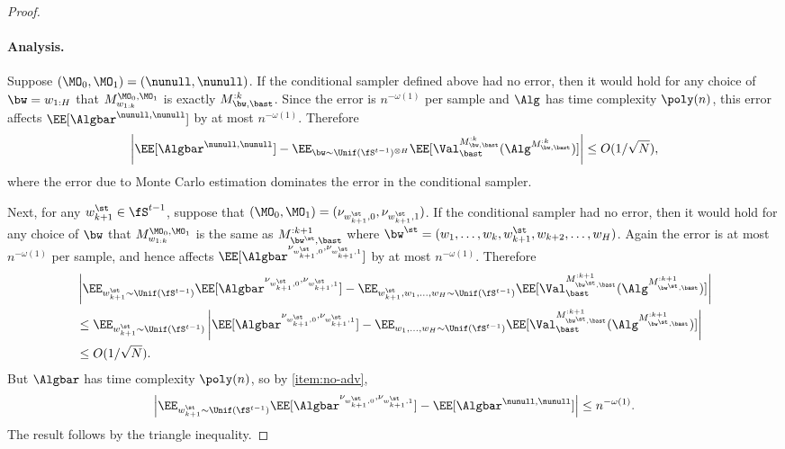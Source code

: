 \begin{proof}
\paragraph{Analysis.} Suppose $(\MO_0,\MO_1) = (\nunull,\nunull)$. If the conditional sampler defined above had no error, then it would hold for any choice of $\bw=w_{1:H}$ that $M^{\MO_0,\MO_1}_{w_{1:k}}$ is exactly $M^{:k}_{\bw,\bast}$. Since the error is $n^{-\omega(1)}$ per sample and $\Alg$ has time complexity $\poly(n)$, this error affects $\EE[\Algbar^{\nunull,\nunull}]$ by at most $n^{-\omega(1)}$. Therefore
\begin{align*}
\left|\EE[\Algbar^{\nunull,\nunull}]
- \EE_{\bw\sim\Unif(\fS^{t-1})^{\otimes H}}\EE[\Val^{M^{:k}_{\bw,\bast}}_{\bast}(\Alg^{M^{:k}_{\bw,\bast}})]\right| \leq O(1/\sqrt{N}),
\end{align*}
where the error due to Monte Carlo estimation dominates the error in the conditional sampler. 

Next, for any $w^\st_{k+1} \in\fS^{t-1}$, suppose that $(\MO_0,\MO_1) = (\nu_{w^\st_{k+1},0},\nu_{w^\st_{k+1},1})$. If the conditional sampler had no error, then it would hold for any choice of $\bw$ that $M^{\MO_0,\MO_1}_{w_{1:k}}$ is the same as $M^{:k+1}_{\bw^\st,\bast}$ where $\bw^\st = (w_1,\dots,w_k,w^\st_{k+1},w_{k+2},\dots,w_H)$. Again the error is at most $n^{-\omega(1)}$ per sample, and hence affects $\EE[\Algbar^{\nu_{w^\st_{k+1},0},\nu_{w^\st_{k+1},1}}]$ by at most $n^{-\omega(1)}$. Therefore
\begin{align*}
&\left|\EE_{w^\st_{k+1}\sim\Unif(\fS^{t-1})}\EE[\Algbar^{\nu_{w^\st_{k+1},0},\nu_{w^\st_{k+1},1}}]
- \EE_{w^\st_{k+1},w_1,\dots,w_H\sim\Unif(\fS^{t-1})}\EE[\Val^{M^{:k+1}_{\bw^\st,\bast}}_{\bast}(\Alg^{M^{:k+1}_{\bw^\st,\bast}})]\right| \\
&\leq \EE_{w^\st_{k+1}\sim\Unif(\fS^{t-1})} \left|\EE[\Algbar^{\nu_{w^\st_{k+1},0},\nu_{w^\st_{k+1},1}}]
- \EE_{w_1,\dots,w_H\sim\Unif(\fS^{t-1})}\EE[\Val^{M^{:k+1}_{\bw^\st,\bast}}_{\bast}(\Alg^{M^{:k+1}_{\bw^\st,\bast}})]\right| \\
&\leq O(1/\sqrt{N}).
\end{align*}
But $\Algbar$ has time complexity $\poly(n)$, so by \cref{item:no-adv},
\[\left|\EE_{w^\st_{k+1}\sim\Unif(\fS^{t-1})}\EE[\Algbar^{\nu_{w^\st_{k+1},0},\nu_{w^\st_{k+1},1}}]
- \EE[\Algbar^{\nunull,\nunull}]\right| \leq n^{-\omega(1)}.\]
The result follows by the triangle inequality.
\end{proof}

